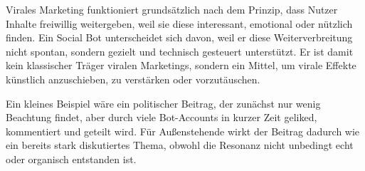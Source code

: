 Virales Marketing funktioniert grundsätzlich nach dem Prinzip, dass Nutzer Inhalte freiwillig weitergeben, weil sie diese interessant, emotional oder nützlich finden. Ein Social Bot unterscheidet sich davon, weil er diese Weiterverbreitung nicht spontan, sondern gezielt und technisch gesteuert unterstützt. Er ist damit kein klassischer Träger viralen Marketings, sondern ein Mittel, um virale Effekte künstlich anzuschieben, zu verstärken oder vorzutäuschen.
	
Ein kleines Beispiel wäre ein politischer Beitrag, der zunächst nur wenig Beachtung findet, aber durch viele Bot-Accounts in kurzer Zeit geliked, kommentiert und geteilt wird. Für Außenstehende wirkt der Beitrag dadurch wie ein bereits stark diskutiertes Thema, obwohl die Resonanz nicht unbedingt echt oder organisch entstanden ist.